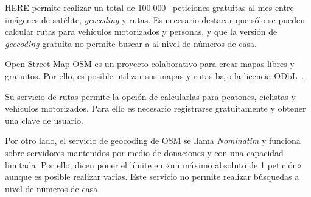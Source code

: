 \begin{definitionlist}
    HERE permite realizar un total de 100.000~\cite{LicenciaHERE} peticiones gratuitas al mes entre
    imágenes de satélite, \emph{geocoding} y rutas. Es necesario destacar que sólo se pueden
    calcular rutas para vehículos motorizados y personas, y que la versión de \emph{geocoding}
    gratuita no permite buscar a al nivel de números de casa.

  \item[Open Street Map] \acs{OSM} es un proyecto colaborativo para crear mapas libres y
    gratuitos. Por ello, es posible utilizar sus mapas y rutas bajo la licencia
    ODbL~\cite{LicenciaOSM}.

    Su servicio de rutas permite la opción de calcularlas para peatones, ciclistas y vehículos
    motorizados. Para ello es necesario registrarse gratuitamente y obtener una clave de usuario.

    Por otro lado, el servicio de geocoding de \acs{OSM} se llama \emph{Nominatim} y funciona sobre
    servidores mantenidos por medio de donaciones y con una capacidad limitada. Por ello, dicen
    poner el límite en «un máximo absoluto de 1 petición»~\cite{Nominatim} aunque es posible
    realizar varias. Este servicio no permite realizar búsquedas a nivel de números de casa.
 
\end{definitionlist}

